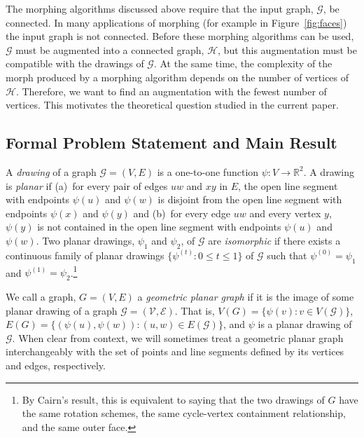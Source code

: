 \documentclass[11pt]{patmorin}
\newcommand{\R}{\mathbb{R}}
\begin{document}
The morphing algorithms discussed above require that the input graph,
$\mathcal{G}$, be connected. In many applications of morphing (for example
in Figure~\ref{fig:faces}) the input graph is not connected. Before these
morphing algorithms can be used, $\mathcal{G}$ must be augmented into a
connected graph, $\mathcal H$, but this augmentation must be compatible
with the drawings of $\mathcal{G}$.  At the same time, the complexity
of the morph produced by a morphing algorithm depends on the number of
vertices of $\mathcal H$.  Therefore, we want to find an augmentation
with the fewest number of vertices.  This motivates the theoretical
question studied in the current paper.




\subsection{Formal Problem Statement and Main Result}

A \emph{drawing} of a graph $\mathcal{G}=(V,E)$ is a one-to-one
function $\psi\colon V\to\R^2$.  A drawing is \emph{planar} if (a)~for
every pair of edges $uw$ and $xy$ in $E$, the open line segment with
endpoints $\psi(u)$ and $\psi(w)$ is disjoint from the open line
segment with endpoints $\psi(x)$ and $\psi(y)$ and (b)~for every edge
$uw$ and every vertex $y$, $\psi(y)$ is not contained in the open line
segment with endpoints $\psi(u)$ and $\psi(w)$.  Two planar drawings,
$\psi_1$ and $\psi_2$, of $\mathcal{G}$ are \emph{isomorphic} if
there exists a continuous family of planar drawings $\{\psi^{(t)}
\colon 0\le t\le 1\}$ of $\mathcal{G}$ such that $\psi^{(0)}=\psi_1$
and $\psi^{(1)}=\psi_2$.\footnote{By Cairn's result, this is equivalent
to saying that the two drawings of $G$ have the same rotation schemes,
the same cycle-vertex containment relationship, and the same outer face.}

We call a graph, $G=(V,E)$ a \emph{geometric planar graph} if it is
the image of some planar drawing of a graph $\mathcal{G}=(\mathcal
V, \mathcal E)$.  That is, $V(G)=\{\psi(v): v\in V(\mathcal{G})\}$,
$E(G)=\{(\psi(u),\psi(w)) : (u,w)\in E(\mathcal G)\}$, and $\psi$ is a planar
drawing of $\mathcal G$.  When clear from context, we will sometimes
treat a geometric planar graph interchangeably with the set of points
and line segments defined by its vertices and edges, respectively.
\end{document}
